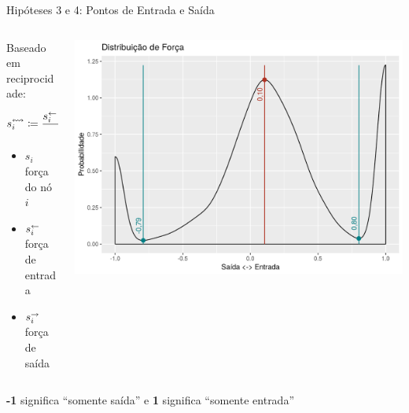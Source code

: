 \documentclass[10pt, hyperref={pdfpagelabels=false}]{beamer}
\begin{document}
{
\begin{frame}[c, label=hipotese-pontos-entrada-e-saida]{Hipóteses 3 e 4: Pontos de Entrada e Saída}
  \begin{center}
    \begin{columns}[onlytextwidth]
      \begin{column}{0.5\textwidth}
        \large
        Baseado em \alert{reciprocidade}:
        
        \normalsize
        \begin{equation*}
          s_i^\leftrightsquigarrow \coloneqq \frac{s_i^\leftarrow - s_i^\rightarrow}{s_i}
        \end{equation*}
        
        \begin{itemize}
          \item[] $s_i$ força do nó $i$
          \item[] $s_i^\leftarrow$ força de entrada
          \item[] $s_i^\rightarrow$ força de saída
        \end{itemize}
      \end{column}
    
      \begin{column}{0.5\textwidth}
        \includegraphics[width=\textwidth]{distribuicao-de-forca}
      \end{column}
    \end{columns}
  
    \vspace{\baselineskip}
  
    \textbf{-1} significa \enquote{somente saída} e \textbf{1} significa \enquote{somente entrada}
  \end{center}
\end{frame}
}
\end{document}
